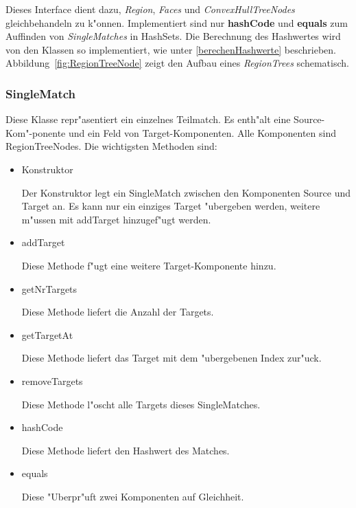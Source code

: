 Dieses Interface dient dazu, \textit{Region}, \textit{Faces} und \textit{ConvexHullTreeNodes} gleichbehandeln zu k"onnen. Implementiert sind nur \textbf{hashCode} und \textbf{equals} zum Auffinden von \textit{SingleMatches} in HashSets. Die Berechnung des Hashwertes wird von den Klassen so implementiert, wie unter \vref{berechenHashwerte} beschrieben. Abbildung~\vref{fig:RegionTreeNode} zeigt den Aufbau eines \textit{RegionTrees} schematisch.




\subsubsection{SingleMatch}
Diese Klasse repr"asentiert ein einzelnes Teilmatch.  Es enth"alt eine Source-Kom"-ponente und ein Feld von Target-Komponenten. Alle Komponenten sind RegionTreeNodes.
Die wichtigsten Methoden sind:

\begin{itemize}
\item Konstruktor

Der Konstruktor legt ein SingleMatch zwischen den Komponenten Source und Target an. Es kann nur ein einziges Target "ubergeben werden, weitere m"ussen mit addTarget hinzugef"ugt werden.



\item addTarget

Diese Methode f"ugt eine weitere Target-Komponente hinzu.

\item getNrTargets

Diese Methode liefert die Anzahl der Targets.

\item getTargetAt

Diese Methode liefert das Target mit dem "ubergebenen Index zur"uck.

\item removeTargets

Diese Methode l"oscht alle Targets dieses SingleMatches.

\item hashCode

Diese Methode liefert den Hashwert des Matches.

\item equals

Diese "Uberpr"uft zwei Komponenten auf Gleichheit.

\end{itemize}

